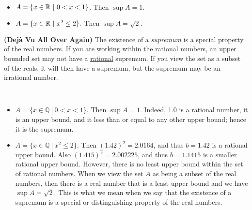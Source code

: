 \begin{example} \mbox{ }
\begin{itemize}
\item $A = \{  x\in \mathbb R~|~ 0  < x < 1\}$. Then $\sup A =1$.
\item $A= \{ x\in \mathbb R~|~ x^2 \le 2\}.$ Then  $\sup A =\sqrt{2}$.
\end{itemize}
\end{example}

\begin{rem}
\textbf{(Dej\`a Vu All Over Again)} The existence of a \emph{supremum} is a special property of the real numbers. If you are working within the rational numbers, an upper bounded set may not have a \underline{rational} supremum. If you view the set as a subset of the reals, it will then have a supremum, but the supremum may be an irrational number.
\end{rem}

\vspace*{.2cm} 

\begin{example} \mbox{ }
\begin{itemize}
\item $A = \{  x\in \mathbb{Q}~|~ 0  < x < 1\}$. Then $\sup A =1$. Indeed, 1.0 is a rational number, it is an upper bound, and it less than or equal to any other upper bound; hence it is the supremum.
\item $A= \{ x\in \mathbb{Q}~|~ x^2 \le 2\}.$  Then $(1.42)^2 = 2.0164$, and thus $b=1.42$ is a rational upper bound. Also $(1.415)^2 = 2.002225$, and thus $b=1.1415$ is a smaller rational upper bound. However, there is no least upper bound within the set of rational numbers. When we view the set $A$ as being a subset of the real numbers, then there is a real number that is a least upper bound and we have $\sup A =\sqrt{2}$. This is what we mean when we say that the existence of a supremum is a special or distinguishing property of the real numbers.
\end{itemize}
\end{example}


\begin{center}

    
\end{center}
\vspace*{.5cm}

